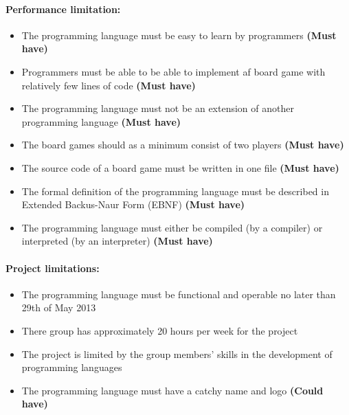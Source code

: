 \paragraph*{Performance limitation:}
\begin{itemize}[noitemsep]
\item The programming language must be easy to learn by programmers \textbf{(Must have)}
\item Programmers must be able to be able to implement af board game with relatively few lines of code \textbf{(Must have)}
\item The programming language must not be an extension of another programming language \textbf{(Must have)}
\item The board games should as a minimum consist of two players \textbf{(Must have)}
\item The source code of a board game must be written in one file \textbf{(Must have)}
\item The formal definition of the programming language must be described in Extended Backus-Naur Form (EBNF) \textbf{(Must have)}
\item The programming language must either be compiled (by a compiler) or interpreted (by an interpreter) \textbf{(Must have)}
\end{itemize}

\paragraph*{Project limitations:}
\begin{itemize}[noitemsep]
\item The programming language must be functional and operable no later than 29th of May 2013
\item There group has approximately 20 hours per week for the project
\item The project is limited by the group members' skills in the development of programming languages
\item The programming language must have a catchy name and logo \textbf{(Could have)}
\end{itemize}

